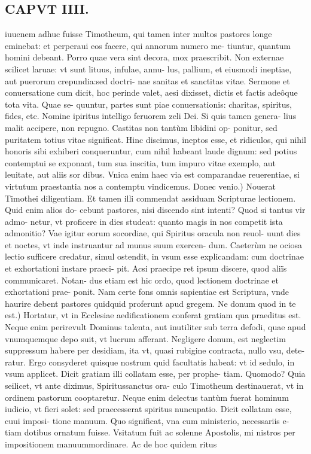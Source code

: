 \documentclass{article}
\begin{document}
\begin{pages}
\section*{CAPVT IIII. }
\marginpar{[ p.53 ]}\pstart iuuenem adhuc fuisse Timotheum, qui tamen inter multos pastores longe eminebat: et perperaui eos facere, qui annorum numero me- tiuntur, quantum homini debeant. Porro quae vera sint decora, mox praescribit. Non externae scilicet laruae: vt sunt lituus, infulae, annu- lus, pallium, et eiusmodi ineptiae, aut puerorum crepundia:sed doctri- nae sanitas et sanctitas vitae. Sermone et conuersatione cum dicit, hoc perinde valet, aesi dixisset, dictis et factis adeôque tota vita. Quae se- quuntur, partes sunt piae conuersationis: charitas, spiritus, fides, etc. Nomine ipiritus intelligo feruorem zeli Dei. Si quis tamen genera- lius malit accipere, non repugno. Castitas non tantùm libidini op- ponitur, sed puritatem totius vitae significat. Hinc discimus, ineptos esse, et ridiculos, qui nihil honoris sibi exhiberi conqueruntur, cum nihil habeant laude dignum: sed potius contemptui se exponant, tum sua inscitia, tum impuro vitae exemplo, aut leuitate, aut aliis sor dibus. Vnica enim haec via est comparandae reuerentiae, si virtutum praestantia nos a contemptu vindicemus.  \pend\pstart Donec venio.) Nouerat Timothei diligentiam. Et tamen illi commendat assiduam Scripturae lectionem. Quid enim alios do- cebunt pastores, nisi discendo sint intenti? Quod si tantus vir admo- netur, vt proficere in dies studeat: quanto magis in nos competit ista admonitio? Vae igitur eorum socordiae, qui Spiritus oracula non reuol- uunt dies et noctes, vt inde instruantur ad munus suum exercen- dum. Caeterùm ne ociosa lectio sufficere credatur, simul ostendit, in vsum esse explicandam: cum doctrinae et exhortationi instare praeci- pit. Acsi praecipe ret ipsum discere, quod aliïs communicaret. Notan- dus etiam est hic ordo, quod lectionem doctrinae et exhortationi prae- ponit. Nam certe fons omnis sapientiae est Scriptura, vnde haurire debent pastores quidquid proferunt apud gregem.  \pend\pstart Ne donum quod in te est.) Hortatur, vt in Ecclesiae aedificationem conferat gratiam qua praeditus est. Neque enim perirevult Dominus talenta, aut inutiliter sub terra defodi, quae apud vnumquemque depo suit, vt lucrum afferant. Negligere donum, est neglectim suppressum habere per desidiam, ita vt, quasi rubigine contracta, nullo vsu, dete- ratur. Ergo consyderet quisque nostrum quid facultatis habeat: vt id sedulo, in vsum applicet. Dicit gratiam illi collatam esse, per prophe- tiam. Quomodo? Quia seilicet, vt ante diximus, Spiritussanctus ora- culo Timotheum destinauerat, vt in ordinem pastorum cooptaretur. Neque enim delectus tantùm fuerat hominum iudicio, vt fieri solet: sed praecesserat spiritus nuncupatio. Dicit collatam esse, cuui imposi- tione manuum. Quo significat, vna cum ministerio, necessariis e- tiam dotibus ornatum fuisse. Vsitatum fuit ac solenne Apostolis, mi nistros per impositionem manuummordinare. Ac de hoc quidem ritus  \pend

\end{pages}
\end{document}
